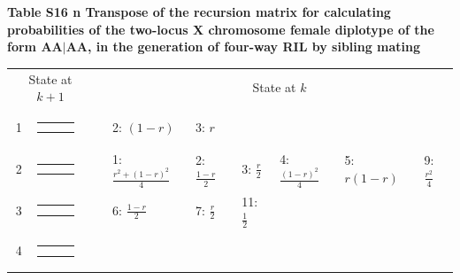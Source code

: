 \documentclass[9pt,letterpaper,twoside]{article}
\begin{document}
\newpage

\noindent \textbf{Table S16 {\color{white} n} Transpose of the recursion matrix for
calculating probabilities of the two-locus X chromosome female diplotype of the form $\boldsymbol{AA|AA}$,
in the generation of four-way RIL by sibling mating}

\bigskip

{
\begin{center}
\begin{tabular}{cccllllll} \hline
\multicolumn{2}{c}{State at $k+1$} & &
\multicolumn{6}{c}{State at $k$} \\
\cline{1-2} \cline{4-9}
1 &
{\renewcommand{\arraystretch}{0.3}
\renewcommand{\tabcolsep}{0.5mm}
\parbox[b][3mm][c]{12mm}{
\begin{tabular}{|p{2mm}|p{2mm}||p{2mm}|} \hline
$\bullet$ & $\bullet$ &           \\
$\bullet$ & $\bullet$ &           \\ \hline
\end{tabular}}}
&
& 2: $(1-r)$
& 3: $r$
& & & & \\
2 &
{\renewcommand{\arraystretch}{0.3}
\renewcommand{\tabcolsep}{0.5mm}
\parbox[b][3mm][c]{12mm}{
\begin{tabular}{|p{2mm}|p{2mm}||p{2mm}|} \hline
$\bullet$ &           & $\bullet$ \\
$\bullet$ &           & $\bullet$ \\ \hline
\end{tabular}}}
&
& 1: $\frac{r^2+(1-r)^2}{4}$
& 2: $\frac{1-r}{2}$
& 3: $\frac{r}{2}$
& 4: $\frac{(1-r)^2}{4}$
& 5: $r(1-r)$
& 9: $\frac{r^2}{4}$
\\
3 &
{\renewcommand{\arraystretch}{0.3}
\renewcommand{\tabcolsep}{0.5mm}
\parbox[b][3mm][c]{12mm}{
\begin{tabular}{|p{2mm}|p{2mm}||p{2mm}|} \hline
$\bullet$ &           & $\bullet$ \\
          & $\bullet$ & $\bullet$ \\ \hline
\end{tabular}}}
&
& 6: $\frac{1-r}{2}$
& 7: $\frac{r}{2}$
& 11: $\frac{1}{2}$
& & & \\
4 &
{\renewcommand{\arraystretch}{0.3}
\renewcommand{\tabcolsep}{0.5mm}
\parbox[b][3mm][c]{12mm}{
\begin{tabular}{|p{2mm}|p{2mm}||p{2mm}|} \hline
$\bullet$ &           &           \\
$\bullet$ &           &           \\ \hline
\end{tabular}}}

\end{tabular}
\end{center}}
\end{document}
